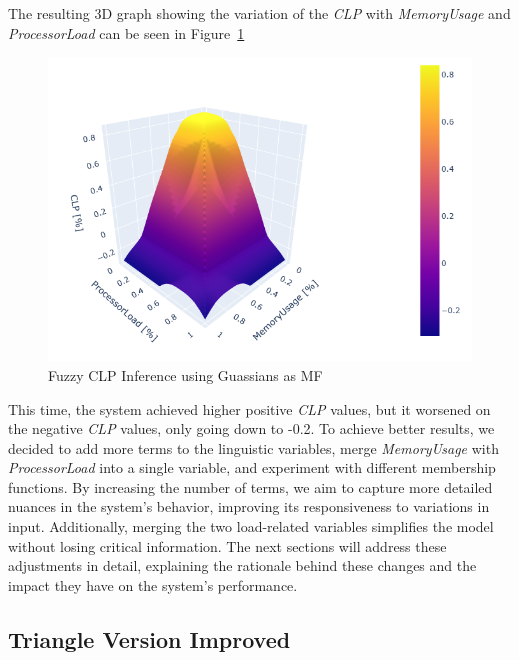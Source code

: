\documentclass[titlepage]{article}
\begin{document}
\vspace{10mm}

The resulting 3D graph showing the variation of the \textit{CLP} with \textit{MemoryUsage} and \textit{ProcessorLoad} can be seen in Figure~\ref{fig:3d_gaussian}

\begin{figure}[H]
    \centering
\includegraphics[scale = 0.7]{../images/3d_guassian}
\caption{Fuzzy CLP Inference using Guassians as MF}
\label{fig:3d_gaussian}
\end{figure}

\vspace{10mm}


This time, the system achieved higher positive \textit{CLP} values, but it worsened on the negative \textit{CLP} values, only going down to -0.2.
To achieve better results, we decided to add more terms to the linguistic variables, merge \textit{MemoryUsage} with \textit{ProcessorLoad} into a single variable, and experiment with different membership functions. By increasing the number of terms, we aim to capture more detailed nuances in the system's behavior, improving its responsiveness to variations in input. Additionally, merging the two load-related variables simplifies the model without losing critical information. The next sections will address these adjustments in detail, explaining the rationale behind these changes and the impact they have on the system's performance.

\subsection{Triangle Version Improved}
\end{document}

